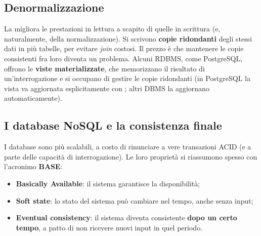\subsection{Denormalizzazione}

La  migliora le prestazioni in lettura a scapito di quelle in scrittura (e, naturalmente, della
normalizzazione). Si scrivono \textbf{copie ridondanti} degli stessi dati in più tabelle, per evitare \textit{join} costosi.
Il prezzo è che mantenere le copie consistenti fra loro diventa un problema. Alcuni RDBMS, come PostgreSQL, offrono le
\textbf{viste materializzate}, che memorizzano il risultato di un'interrogazione e si occupano di gestire le copie
ridondanti (in PostgreSQL la vista va aggiornata esplicitamente con ; altri DBMS la
aggiornano automaticamente).

\subsection{I database NoSQL e la consistenza finale}

I database  sono più scalabili, a costo di rinunciare a vere transazioni ACID (e a parte delle capacità di
interrogazione). Le loro proprietà si riassumono spesso con l'acronimo \textbf{BASE}:
\begin{itemize}
  \item \textbf{Basically Available}: il sistema garantisce la disponibilità;
  \item \textbf{Soft state}: lo stato del sistema può cambiare nel tempo, anche senza input;
  \item \textbf{Eventual consistency}: il sistema diventa consistente \textbf{dopo un certo tempo}, a patto di non ricevere
        nuovi input in quel periodo.
\end{itemize}



